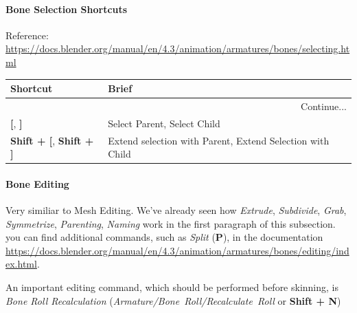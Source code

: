 \documentclass{article}
\begin{document}
\paragraph{Bone Selection Shortcuts}
Reference: \href{https://docs.blender.org/manual/en/4.3/animation/armatures/bones/selecting.html}{https://docs.blender.org/manual/en/4.3/animation/armatures/bones/selecting.html}
\begin{longtable}{lp{}}
    \toprule
    \textbf{Shortcut} & \textbf{Brief} \\
    \midrule
    \endhead
    \midrule
    \multicolumn{2}{r}{Continue...} \\
    \bottomrule
    \endfoot
    \bottomrule
    \endlastfoot

    \textbf{[}, \textbf{]} & Select Parent, Select Child \\
    \textbf{Shift + [}, \textbf{Shift + ]} & Extend selection with Parent, Extend Selection with Child \\
\end{longtable}

\paragraph{Bone Editing}
Very similiar to Mesh Editing. We've already seen how \textit{Extrude}, \textit{Subdivide}, \textit{Grab}, \textit{Symmetrize}, \textit{Parenting}, \textit{Naming} work in the first paragraph of this
subsection. you can find additional commands, such as \textit{Split} (\textbf{P}), in the documentation \href{https://docs.blender.org/manual/en/4.3/animation/armatures/bones/editing/index.html}{https://docs.blender.org/manual/en/4.3/animation/armatures/bones/editing/index.html}.\par
An important editing command, which should be performed before skinning, is \textit{Bone Roll Recalculation} (\mbox{\textit{Armature/Bone Roll/Recalculate Roll}} or \textbf{Shift + N})
\end{document}
